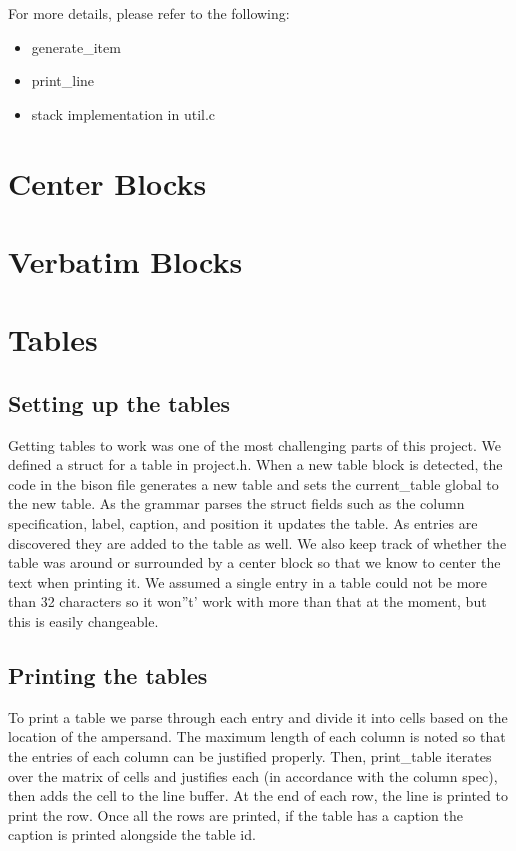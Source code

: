 For more details, please refer to the following:
\begin{itemize}
\item generate_item
\item print_line
\item stack implementation in util.c
\end{itemize}

\section{Center Blocks}

\section{Verbatim Blocks}

\section{Tables}

\subsection{Setting up the tables}
Getting tables to work was one of the most challenging parts of this project. We defined a
struct for a table in project.h. When a new table block is detected, the code in the bison
file generates a new table and sets the current_table global to the new table. As the
grammar parses the struct fields such as the column specification, label, caption, and 
position it updates the table. As entries are discovered they are added to the table as
well. We also keep track of whether the table was around or surrounded by a center block 
so that we know to center the text when printing it. We assumed a single entry in a table 
could not be more than 32 characters so it won''t' work with more than that at the moment,
but this is easily changeable.

\subsection{Printing the tables}
To print a table we parse through each entry and divide it into cells based on the location
of the ampersand. The maximum length of each column is noted so that the entries of each 
column can be justified properly. Then, print_table iterates over the matrix of cells and
justifies each (in accordance with the column spec), then adds the cell to the line buffer.
At the end of each row, the line is printed to print the row. Once all the rows are 
printed, if the table has a caption the caption is printed alongside the table id.

